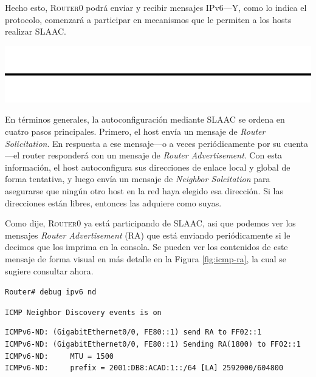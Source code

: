 \documentclass[a4paper,10pt]{corsage}
\makeatletter
\newcommand{\devname}[1]{\textsc{#1}}
\newcommand*{\@doendeq}{%
	\everypar{{\setbox\z@\lastbox}\everypar{}}%
}
\newcommand{\pant}{%
	\par\vspace*{-\parskip}\vspace{0.8\baselineskip}%
	\centerline{\includegraphics[height=\baselineskip]{pant}}%
	\vspace*{-\parskip}\vspace{0.8\parskip}%
	\ignorespacesafterend\par\noindent\aftergroup
}
\newenvironment{console}{%
	\begin{tcolorbox}[
		left skip=1cm,
		right skip=1Cm,
		left=8pt,
		right=8pt,
		top=2.5\parskip,
		bottom=2\parskip,
		colback=gray!10,
		colframe=gray!40,
		boxrule=0pt,
		leftrule=4pt,
		sharp corners=all,
		fontupper=\ttfamily\flushleft\footnotesize
	]%
}{%
	\end{tcolorbox}%
	\ignorespacesafterend\par\noindent\aftergroup\@doendeq%
}
\makeatother
\begin{document}
	Hecho esto, \devname{Router0} podrá enviar y recibir mensajes IPv6---Y, como lo indica el protocolo, comenzará a participar en mecanismos que le permiten a los hosts realizar SLAAC.

	\pant

	En términos generales, la autoconfiguración mediante SLAAC se ordena en cuatro pasos principales.  Primero, el host envía un mensaje de \textit{Router Solicitation}.  En respuesta a ese mensaje---o a veces periódicamente por su cuenta---el router responderá con un mensaje de \textit{Router Advertisement}.  Con esta información, el host autoconfigura sus direcciones de enlace local y global de forma tentativa, y luego envía un mensaje de \textit{Neighbor Solcitation} para asegurarse que ningún otro host en la red haya elegido esa dirección.  Si las direcciones están libres, entonces las adquiere como suyas.

	Como dije, \devname{Router0} ya está participando de SLAAC, asi que podemos ver los mensajes \textit{Router Advertisement} (RA) que está enviando periódicamente si le decimos que los imprima en la consola.  Se pueden ver los contenidos de este mensaje de forma visual en más detalle en la Figura \ref{fig:icmp-ra}, la cual se sugiere consultar ahora.
	\begin{console}
		\verb|Router# debug ipv6 nd|

		\verb|ICMP Neighbor Discovery events is on|
	\end{console}

	\begin{console}
		\begin{verbatim}ICMPv6-ND: (GigabitEthernet0/0, FE80::1) send RA to FF02::1
ICMPv6-ND: (GigabitEthernet0/0, FE80::1) Sending RA(1800) to FF02::1
ICMPv6-ND:     MTU = 1500
ICMPv6-ND:     prefix = 2001:DB8:ACAD:1::/64 [LA] 2592000/604800\end{verbatim}
	\end{console}
\end{document}
